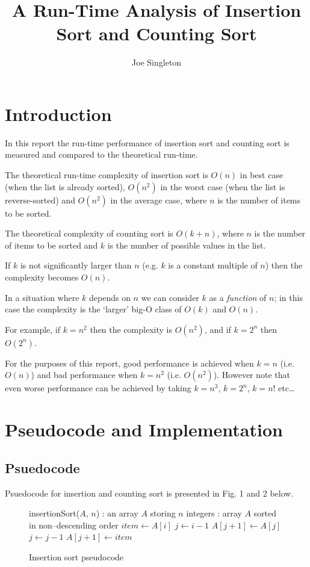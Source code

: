 \documentclass{article}
\title{A Run-Time Analysis of Insertion Sort and Counting Sort}
\author{Joe Singleton}
\date{}
\begin{document}
\maketitle

\tableofcontents

\section{Introduction}

In this report the run-time performance of insertion sort and counting sort is measured and compared to the theoretical run-time.

The theoretical run-time complexity of insertion sort is $O(n)$ in best case (when the list is already sorted), $O(n^2)$ in the worst case (when the list is reverse-sorted) and $O(n^2)$ in the average case, where $n$ is the number of items to be sorted.

The theoretical complexity of counting sort is $O(k+n)$, where $n$ is the number of items to be sorted and $k$ is the number of possible values in the list.

If $k$ is not significantly larger than $n$ (e.g. $k$ is a constant multiple of $n$) then the complexity becomes $O(n)$.

In a situation where $k$ depends on $n$ we can consider $k$ as a \textit{function} of $n$; in this case the complexity is the `larger' big-O class of $O(k)$ and $O(n)$.

For example, if $k=n^2$ then the complexity is $O(n^2)$, and if $k=2^n$ then $O(2^n)$.

For the purposes of this report, good performance is achieved when $k=n$ (i.e. $O(n)$) and bad performance when $k=n^2$ (i.e. $O(n^2)$). However note that even worse performance can be achieved by taking $k=n^3$, $k=2^n$, $k=n!$ etc\ldots

\section{Pseudocode and Implementation}

\subsection{Psuedocode}
Psuedocode for insertion and counting sort is presented in Fig. 1 and 2 below.

\begin{figure}[H]
\begin{algorithmic}
 insertionSort($A$, $n$)
: an array $A$ storing $n$ integers
: array $A$ sorted in non--descending order
  \STATE $item \leftarrow A[i]$
  \STATE $j \leftarrow i-1$
    \STATE $A[j+1] \leftarrow A[j]$
    \STATE $j \leftarrow j-1$
  \ENDWHILE
  \STATE $A[j+1] \leftarrow item$
\ENDFOR
\end{algorithmic}
\caption{Insertion sort pseudocode}
\end{figure}
\end{document}
